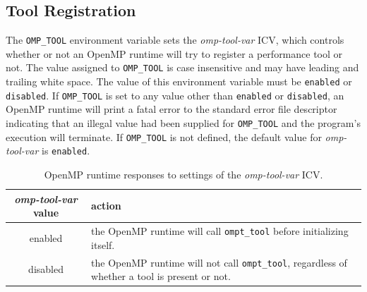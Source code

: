 \documentclass{article}
\begin{document}
\subsection{Tool Registration}
\label{sec:env}

The  \verb|OMP_TOOL| environment variable sets the {\em omp-tool-var} ICV, which controls whether or not an OpenMP 
runtime will try to register a performance tool or not. The value assigned to \verb|OMP_TOOL| is 
case insensitive and may have leading and trailing white space.  The value of
this environment variable must be \verb|enabled| or \verb|disabled|.   If  \verb|OMP_TOOL| is set to any value other than \verb|enabled| or \verb|disabled|, an OpenMP runtime will print a fatal error  to the standard error file descriptor indicating that an illegal value had been supplied for \verb|OMP_TOOL| and the program's execution will terminate. If \verb|OMP_TOOL| is not defined, the default value for  {\em omp-tool-var}  is  \verb|enabled|.

 \begin{table}
\begin{center}
\begin{tabular}{|c|p{4.5in}|}
\hline
 {\em omp-tool-var} value & action \\\hline
enabled & the OpenMP runtime will call  \verb|ompt_tool| before initializing itself.   \\\hline
disabled & the OpenMP runtime will not call  \verb|ompt_tool|, regardless of whether a tool is present or not.  \\\hline
\end{tabular}
\end{center}
\caption{OpenMP runtime responses to settings of the {\em omp-tool-var} ICV.}
\label{table:env-var}
\end{table}
\end{document}
